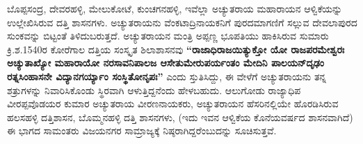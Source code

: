 ಬೊಪ್ಪಸಂದ್ರ, ದೇವರಹಳ್ಳಿ, ಮೇಲುಕೋಟೆ, ಕುಂಚಗನಹಳ್ಳಿ, ಇವೆಲ್ಲಾ ಅಚ್ಯುತರಾಯ ಮಹಾರಾಯನ ಆಳ್ವಿಕೆಯನ್ನು ಉಲ್ಲೇಖಿಸಿರುವ ದತ್ತಿ ಶಾಸನಗಳು. ಅಚ್ಯುತರಾಯನು ವೆಂಕಟಾದ್ರಿನಾಯಕನಿಗೆ ಪುರದಮಾಗಣಿಗೆ ಸಲ್ಲುವ ದೇವಲಾಪುರದ ಸುಂಕವನ್ನು ಬಿಟ್ಟಂತೆ ತಿಳಿದುಬರುತ್ತದೆ. ಅಚ್ಯುತರಾಯನ ಮಂತ್ರಿ ಅಪ್ಪಣ್ಣ ಭೂಪತಿಯು ಹಾಕಿಸಿರುವ ಸುಮಾರು ಕ್ರಿ.ಶ.1540ರ ಕೋರೆಗಾಲ ದತ್ತಿಯ ಸಂಸ್ಕೃತ ಶಿಲಾಶಾಸನವು \textbf{“ರಾಜಾಧಿರಾಜಯಿತ್ಯುಕ್ತೋ ಯೋ ರಾಜಪರಮೇಶ್ವರಃ ಅಚ್ಯುತಾಖ್ಯೋ ಮಹಾರಾಯೋ ನರಸಾವನಿಪಾಲಜ ಆಸೇತುಮೇರುಪರ್ಯಂತಂ ಮೇದಿನಿ ಪಾಲಯನ್​ ದೃಢಂ ರತ್ನಸಿಂಹಾಸನೇ ವಿದ್ಯಾನಗರ್ಯ್ಯಾಂ ಸಂಸ್ಥಿತೋನೃಪಃ” }ಎಂದು ಸ್ತುತಿಸಿದ್ದು, ಈ ವೇಳೆಗೆ ಅಚ್ಯುತರಾಯನು ತನ್ನ ಶತ್ರುಗಳನ್ನು ನಿವಾರಿಸಿಕೊಂಡು ಸ್ಥಿರವಾಗಿ ಆಳುತ್ತಿದ್ದನೆಂದು ಹೇಳಬಹುದು. ಆಲುಗೋಡು ರಾಜ್ಯಾಧಿಪ ವೀರಪ್ಪವೊಡಯರ ಕುಮಾರ ಅಚ್ಯುತರಾಯ ವೀರಣನಾಯಕರು, ಅಚ್ಯುತರಾಯನ ಹೆಸರಿನಲ್ಲಿಯೇ ಹೊರಡಿಸಿರುವ ಹಲಸಹಳ್ಳಿ ದತ್ತಿಶಾಸನ, ಬೊಮ್ಮನಹಳ್ಳಿ ದತ್ತಿ ಶಾಸನಗಳು, (ಇದು ಇವನ ಆಳ್ವಿಕೆಯ ಕೊನೆಯವರ್ಷದ ಶಾಸನವಾಗಿದೆ) ಈ ಭಾಗದ ಸಾಮಂತರು ವಿಜಯನಗರ ಸಾಮ್ರಾಜ್ಯಕ್ಕೆ ನಿಷ್ಠರಾಗಿದ್ದರೆಂಬುದನ್ನು ಸೂಚಿಸುತ್ತವೆ.

